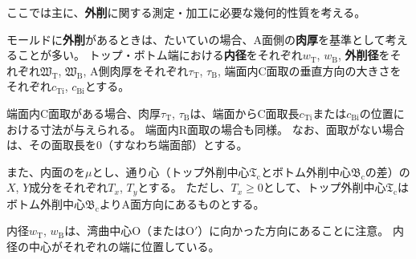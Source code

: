 

ここでは主に、\textbf{外削}に関する測定・加工に必要な幾何的性質を考える。

モールドに\textbf{外削}があるときは、たいていの場合、A面側の\textbf{肉厚}を基準として考えることが多い。
トップ・ボトム端における\textbf{内径}をそれぞれ$w_\mathrm T$, $w_\mathrm B$, \textbf{外削径}をそれぞれ$\mathfrak W_\mathrm T$, $\mathfrak W_\mathrm B$, A側肉厚をそれぞれ$\tau_\mathrm T$, $\tau_\mathrm B$, 端面内C面取の垂直方向の大きさをそれぞれ$c_\mathrm{Ti}$, $c_\mathrm{Bi}$とする。
\begin{hosoku}
端面内C面取がある場合、肉厚$\tau_\mathrm T$, $\tau_\mathrm B$は、端面からC面取長$c_\mathrm{Ti}$または$c_\mathrm{Bi}$の位置における寸法が与えられる。
端面内R面取の場合も同様。
なお、面取がない場合は、その面取長を0（すなわち端面部）とする。
\end{hosoku}
また、内面の\textbf{\PlatingThk}を$\mu$とし、通り心（トップ外削中心$\mathfrak T_\mathrm c$とボトム外削中心$\mathfrak B_\mathrm c$の差）の$X$, $Y$成分をそれぞれ$T_x$, $T_y$とする。
ただし、$T_x \geq 0$として、トップ外削中心$\mathfrak T_\mathrm c$はボトム外削中心$\mathfrak B_\mathrm c$よりA面方向にあるものとする。
\begin{hosoku}
内径$w_\mathrm T$, $w_\mathrm B$は、湾曲中心O（またはO$'$）に向かった方向にあることに注意。
内径の中心がそれぞれの端に位置している。
\end{hosoku}



